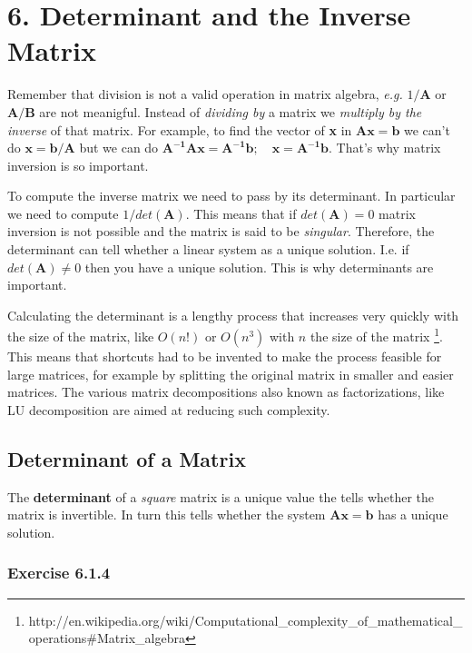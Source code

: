 \section{6. Determinant and the Inverse Matrix}

Remember that division is not a valid operation in matrix algebra, \emph{e.g.}
$1/\mathbf{A}$ or $\mathbf{A/B}$ are not meanigful. Instead of \emph{dividing by} a matrix
we \emph{multiply by the inverse} of that matrix. For example, to find the vector of \textbf{x}
in $\mathbf{Ax = b}$ we can't do $\mathbf{x= b/A}$ but we can do
$\mathbf{A^{-1}Ax = A^{-1}b; \quad x = A^{-1}b}$. That's why matrix inversion is
so important.

To compute the inverse matrix we need to pass by its determinant.
In particular we need to compute $1/det(\mathbf{A})$. This means that if
$det(\mathbf{A}) = 0$ matrix inversion is not possible and the matrix is said
to be \emph{singular}. Therefore, the determinant
can tell whether a linear system as a unique solution. I.e. if $det(\mathbf{A}) \neq 0$
then you have a unique solution. This is why determinants are important.

Calculating the determinant is a lengthy process that increases very quickly with
the size of the matrix, like $O(n!)$ or $O(n^3)$ with $n$ the size of the matrix
\footnote{http://en.wikipedia.org/wiki/Computational\_complexity\_of\_mathematical\_operations\#Matrix\_algebra}.
This means that shortcuts had to be invented to make the process feasible for large
matrices, for example by splitting the original matrix in smaller and easier
matrices. The various matrix decompositions also known as factorizations, like LU decomposition
are aimed at reducing such complexity.

\subsection{Determinant of a Matrix}

The \textbf{determinant} of a \emph{square} matrix is a unique value the tells
whether the matrix is invertible. In turn this tells whether the system $\mathbf{Ax = b}$
has a unique solution.

\subsubsection{Exercise 6.1.4}

